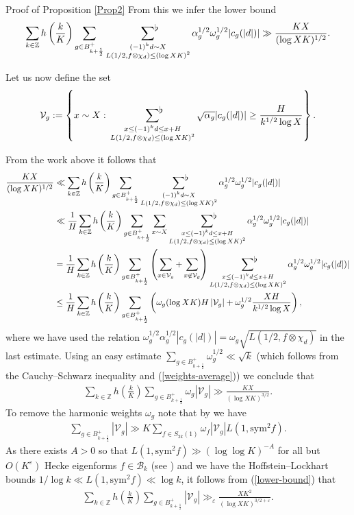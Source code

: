 \documentclass[a4paper,10pt,twoside]{amsart}
\theoremstyle{definition}
\numberwithin{equation}{section}
\newcommand\Z{\mathbb{Z}}
\newcommand\eps{\varepsilon}
\renewcommand\:{\colon}
\newcommand{\sumflat}{\mathop{{\sum}^{\raisebox{-3pt}{\makebox[0pt][l]{$\flat$}}}}}
\begin{document}
\begin{subsection}{Proof of Proposition \ref{Prop2}}
From this we infer the lower bound
\[\sum_{k\in\Z}h\left(\frac{k}K\right)\sum_{g\in B_{k+\frac12}^+}\sumflat_{\substack{(-1)^kd\sim X\\
L(1/2,f\otimes\chi_{d})\leq (\log XK)^{2}}}\alpha_g^{1/2}\omega_g^{1/2}|c_g(|d|)|\gg \frac{KX}{(\log XK)^{1/2}}.\]

Let us now define the set
\[\mathcal V_g:=\left\{x\sim X:\,\sumflat_{\substack{x\leq(-1)^kd\leq x+H\\
L(1/2,f\otimes\chi_{d})\leq (\log XK)^{2}}}\sqrt{\alpha_g}|c_g(|d|)|\geq\frac{H}{k^{1/2}\log X}\right\}.\]

From the work above it follows that
\begin{align*}
\frac{KX}{(\log XK)^{1/2}}&\ll\sum_{k\in\Z}h\left(\frac{k}K\right)\sum_{g\in B_{k+\frac12}^+}\sumflat_{\substack{(-1)^kd\sim X\\
L(1/2,f\otimes\chi_{d})\leq (\log XK)^{2}}}\alpha_g^{1/2}\omega_g^{1/2}|c_g(|d|)|\\
&\ll\frac1H\sum_{k\in\Z}h\left(\frac{k}K\right)\sum_{g\in B_{k+\frac12}^+}\sum_{x\sim X}\sumflat_{\substack{x\leq (-1)^kd\leq x+H\\
L(1/2,f\otimes\chi_{d})\leq (\log XK)^{2}}}\alpha_g^{1/2}\omega_g^{1/2}|c_g(|d|)|\\
&=\frac1H\sum_{k\in\Z}h\left(\frac{k}K\right)\sum_{g\in B_{k+\frac12}^+}\left(\sum_{x\in\mathcal V_g}+\sum_{x\not\in\mathcal V_g}\right)\sumflat_{\substack{x\leq (-1)^kd\leq x+H\\
L(1/2,f\otimes\chi_{d})\leq (\log XK)^{2}}}\alpha_g^{1/2}\omega_g^{1/2}|c_g(|d|)|\\
&\leq\frac1H\sum_{k\in\Z}h\left(\frac{k}K\right)\sum_{g\in B_{k+\frac12}^+}\left(\omega_g(\log XK)H\left|\mathcal V_g\right|+\omega_g^{1/2}\frac{XH}{k^{1/2}\log X}\right),
\end{align*}
where we have used the relation $\omega_g^{1/2}\alpha_g^{1/2}|c_g(|d|)|=\omega_g\sqrt{L(1/2,f\otimes\chi_d)}$ in the last estimate. Using an easy estimate $\sum_{g\in B_{k+\frac12}^+}\omega_g^{1/2}\ll\sqrt k$ (which follows from the Cauchy--Schwarz inequality and (\ref{weights-average})) we conclude that
\begin{align}\label{lower-bound}
\sum_{k\in\Z}h\left(\frac{k}K\right)\sum_{g\in B_{k+\frac12}^+}\omega_g\left|\mathcal V_g\right|\gg \frac{KX}{(\log XK)^{3/2}}.
\end{align}
To remove the harmonic weights $\omega_g$ note that by \cite[(8.18)]{Balkanova-Frolenkov2021} we have 
\begin{align*}
\sum_{g\in B_{k+\frac12}^+}|\mathcal V_g|\gg K\sum_{f\in S_{2k}(1)}\omega_f|\mathcal V_g|L(1,\text{sym}^2f).
\end{align*}
As there exists $A>0$ so that $L(1,\text{sym}^2f)\gg (\log\log K)^{-A}$ for all but $O(K^\eps)$ Hecke eigenforms $f\in\mathcal B_k$ (see \cite{Lau-Wu2006}) and we have the Hoffstein--Lockhart bounds $1/\log k\ll L(1,\text{sym}^2f)\ll\log k$, it follows from (\ref{lower-bound}) that
\begin{align}\label{V_g-on-av}
\sum_{k\in\Z}h\left(\frac{k}K\right)\sum_{g\in B_{k+\frac12}^+}\left|\mathcal V_g\right|\gg_\eps \frac{XK^2}{(\log XK)^{3/2+\eps}}.
\end{align}


\end{subsection}
\end{document}
